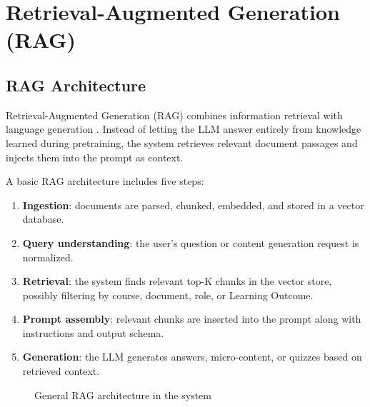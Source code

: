 \section{Retrieval-Augmented Generation (RAG)}
\label{sec:rag}

\subsection{RAG Architecture}
\label{subsec:kien-truc-rag}

Retrieval-Augmented Generation (RAG) combines information retrieval with
language generation \cite{lewis2020rag}. Instead of letting the LLM answer
entirely from knowledge learned during pretraining, the system retrieves
relevant document passages and injects them into the prompt as context.

A basic RAG architecture includes five steps:

\begin{enumerate}
    \item \textbf{Ingestion}: documents are parsed, chunked, embedded, and
          stored in a vector database.
    \item \textbf{Query understanding}: the user's question or content
          generation request is normalized.
    \item \textbf{Retrieval}: the system finds relevant top-K chunks in
          the vector store, possibly filtering by course, document, role,
          or Learning Outcome.
    \item \textbf{Prompt assembly}: relevant chunks are inserted into the
          prompt along with instructions and output schema.
    \item \textbf{Generation}: the LLM generates answers, micro-content,
          or quizzes based on retrieved context.
\end{enumerate}

\begin{figure}[H]
    \centering
    \caption{General RAG architecture in the system}
    \label{fig:rag-architecture}
\end{figure}

